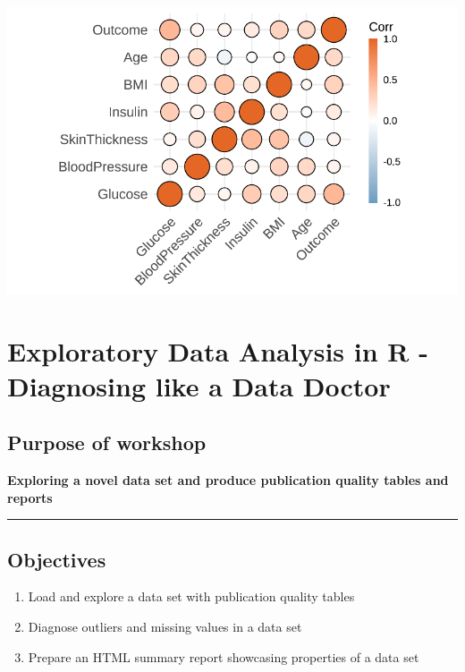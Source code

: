 \documentclass[
  letterpaper,
  DIV=11,
  numbers=noendperiod]{scrreprt}
\providecommand{\tightlist}{%
  \setlength{\itemsep}{0pt}\setlength{\parskip}{0pt}}\usepackage{longtable,booktabs,array}
\begin{document}
\includegraphics{./intro_files/figure-pdf/unnamed-chunk-12-1.pdf}


\hypertarget{exploratory-data-analysis-in-r---diagnosing-like-a-data-doctor-1}{%
\chapter{Exploratory Data Analysis in R - Diagnosing like a Data
Doctor}\label{exploratory-data-analysis-in-r---diagnosing-like-a-data-doctor-1}}

\hypertarget{purpose-of-workshop-1}{%
\section{Purpose of workshop}\label{purpose-of-workshop-1}}

\textbf{Exploring a novel data set and produce publication quality
tables and reports}

\begin{center}\rule{0.5\linewidth}{0.5pt}\end{center}

\hypertarget{objectives}{%
\section{Objectives}\label{objectives}}

\begin{enumerate}
\def\labelenumi{\arabic{enumi}.}
\tightlist
\item
  Load and explore a data set with publication quality tables
\item
  Diagnose outliers and missing values in a data set
\item
  Prepare an HTML summary report showcasing properties of a data set
\end{enumerate}
\end{document}
